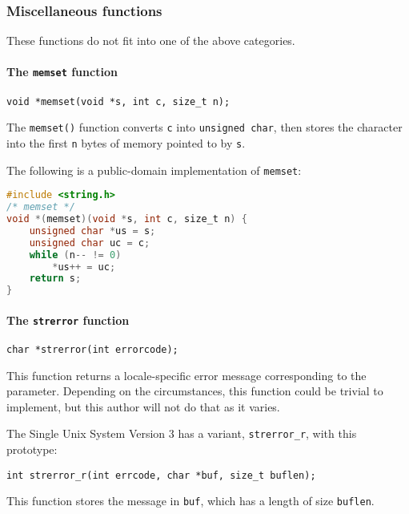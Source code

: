 \subsubsection{Miscellaneous functions}
These functions do not fit into one of the above categories.

\paragraph{The \texttt{memset} function}
\texttt{void *memset(void *s, int c, size\_t n);}

The \texttt{memset()} function converts \texttt{c} into \texttt{unsigned char},
then stores the character into the first \texttt{n} bytes of memory pointed to
by \texttt{s}.

The following is a public-domain implementation of \texttt{memset}:
\lstset{basicstyle=\scriptsize, numbers=left, captionpos=b, tabsize=4}
\begin{lstlisting}[caption=Section \thesection listing \arabic{stringcnt},language={C},
breaklines=true,xleftmargin=15pt,label=lst:section\thesection listing\arabic{stringcnt}]
#include <string.h>
/* memset */
void *(memset)(void *s, int c, size_t n) {
	unsigned char *us = s;
	unsigned char uc = c;
	while (n-- != 0)
		*us++ = uc;
	return s;
}
\end{lstlisting}

\paragraph{The \texttt{strerror} function}
\texttt{char *strerror(int errorcode);}

This function returns a locale-specific error message corresponding to the
parameter. Depending on the circumstances, this function could be trivial to
implement, but this author will not do that as it varies.

The Single Unix System Version 3 has a variant, \texttt{strerror\_r}, with this
prototype:

\texttt{int strerror\_r(int errcode, char *buf, size\_t buflen);}

This function stores the message in \texttt{buf}, which has a length of size
\texttt{buflen}.
